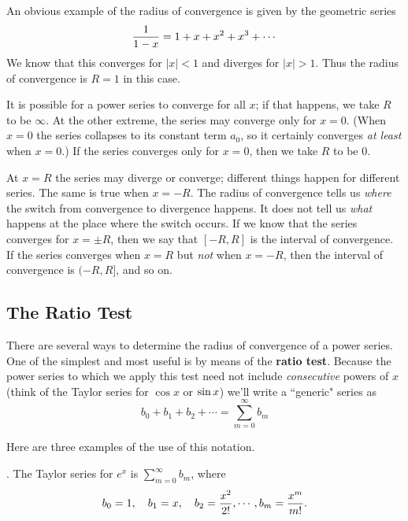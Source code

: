 {{{{\begin{center}
\end{center}




        An obvious example of the radius of convergence is given by
the geometric series
\[
{1\over1-x} = 1 + x + x^2 + x^3 + \cdots
\]
We know that this converges for $|x| < 1$ and diverges for $|x| > 1$.
Thus the radius of convergence is $R = 1$ in this case.

     It is possible for a power series to converge for all $x$; if that happens, we take $R$ to be $\infty$.  At the other extreme, the series may converge only for $x = 0$.  (When $x = 0$ the series collapses to its constant term $a_0$, so it certainly converges {\em at least\/} when $x = 0$.) If the series converges only for $x = 0$, then we take $R$ to be 0.

     At $x = R$ the series may diverge or converge; different things happen for different series.  The same is true when $x = -R$.  The radius of convergence tells us {\em where\/} the switch from convergence to divergence happens.  It does not tell us {\em what\/} happens at the place where the switch occurs.  If we know that the series converges for $x=\pm R$, then we say that $[-R,R]$ is the  interval of convergence.  If the series converges when $x=R$ but {\em not\/} when $x=-R$, then the interval of convergence is $(-R,R]$, and so on.






\subsection{The Ratio Test}

     There are several ways to determine the radius of convergence of
a power series.  One of the simplest and most useful is by means of the {\bf ratio test}.
Because the power series to which we apply this test need not include {\em consecutive} powers of $x$ (think of the Taylor series for $\cos x$ or $\sin x\/$) we'll write a ``generic" series as
\[
b_0 + b_1 + b_2 + \cdots = \sum_{m=0}^\infty b_m
\] 

\noindent
Here are three examples of the use of this notation.
\medskip

.  The Taylor series for $e^x$ is ${\displaystyle \sum_{m=0}^\infty b_m}$, where
\[
b_0 = 1, \quad  b_1 = x, \quad b_2 = {x^2 \over 2!}, \cdots , b_m = {x^m \over m!}.
\]

}}}}
